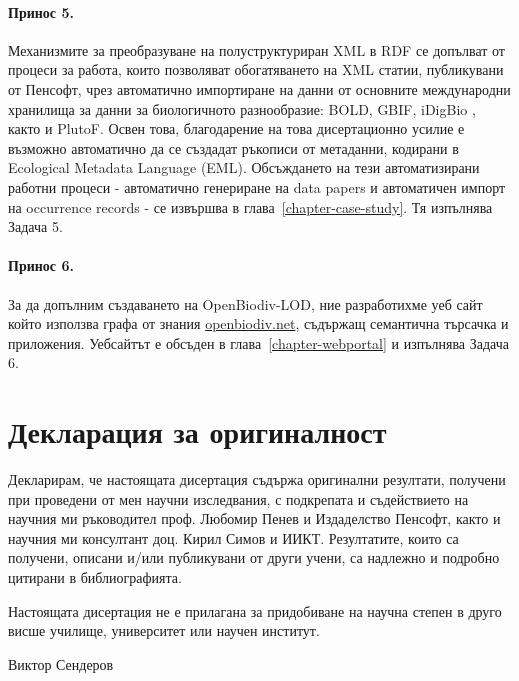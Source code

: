 \paragraph{Принос 5.} Механизмите за преобразуване на полуструктуриран XML в RDF се допълват от процеси за работа, които позволяват обогатяването на XML статии, публикувани от Пенсофт, чрез автоматично импортиране на данни от основните международни хранилища за данни за биологичното разнообразие: BOLD, GBIF, iDigBio , както и PlutoF. Освен това, благодарение на това дисертационно усилие е възможно автоматично да се създадат ръкописи от метаданни, кодирани в Ecological Metadata Language (EML). Обсъждането на тези автоматизирани работни процеси - автоматично генериране на data papers и автоматичен импорт на occurrence records - се извършва в глава~\ref{chapter-case-study}. Тя изпълнява Задача 5.

\paragraph{Принос 6.} За да допълним създаването на OpenBiodiv-LOD, ние разработихме уеб сайт който използва графа от знания \href{http://openbiodiv.net}{openbiodiv.net}, съдържащ семантична търсачка и приложения. Уебсайтът е обсъден в глава~\ref{chapter-webportal} и изпълнява Задача 6.

\section*{Декларация за оригиналност}

Декларирам, че настоящата дисертация съдържа оригинални резултати, получени 
при проведени от мен научни изследвания, с подкрепата и съдействието на научния ми ръководител проф. Любомир Пенев и Издаделство Пенсофт, както и научния ми консултант доц. Кирил Симов и ИИКТ.  Резултатите,  които  са  получени,  описани  и/или  публикувани  от  други учени, са надлежно и подробно цитирани в библиографията.

Настоящата дисертация не е прилагана за придобиване на научна степен в друго 
висше училище, университет или научен институт.

Виктор Сендеров

